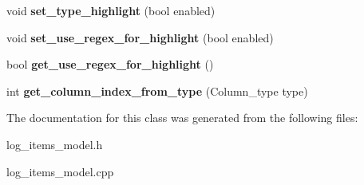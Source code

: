 \begin{DoxyCompactItemize}
\item 
\hypertarget{class_log__viewer_1_1_log__items__model_a4c70981f49821218b04e56e37044b86f}{void {\bfseries set\-\_\-type\-\_\-highlight} (bool enabled)}\label{class_log__viewer_1_1_log__items__model_a4c70981f49821218b04e56e37044b86f}

\item 
\hypertarget{class_log__viewer_1_1_log__items__model_a07d88207be51cb27ebd41c818ef4ada6}{void {\bfseries set\-\_\-use\-\_\-regex\-\_\-for\-\_\-highlight} (bool enabled)}\label{class_log__viewer_1_1_log__items__model_a07d88207be51cb27ebd41c818ef4ada6}

\item 
\hypertarget{class_log__viewer_1_1_log__items__model_aa63a8057f03e78a5f2191f953d6be5db}{bool {\bfseries get\-\_\-use\-\_\-regex\-\_\-for\-\_\-highlight} ()}\label{class_log__viewer_1_1_log__items__model_aa63a8057f03e78a5f2191f953d6be5db}

\item 
\hypertarget{class_log__viewer_1_1_log__items__model_a8dc47edb18bfeb1469ea6111cd9ee676}{int {\bfseries get\-\_\-column\-\_\-index\-\_\-from\-\_\-type} (Column\-\_\-type type)}\label{class_log__viewer_1_1_log__items__model_a8dc47edb18bfeb1469ea6111cd9ee676}

\end{DoxyCompactItemize}


The documentation for this class was generated from the following files\-:\begin{DoxyCompactItemize}
\item 
log\-\_\-items\-\_\-model.\-h\item 
log\-\_\-items\-\_\-model.\-cpp\end{DoxyCompactItemize}

